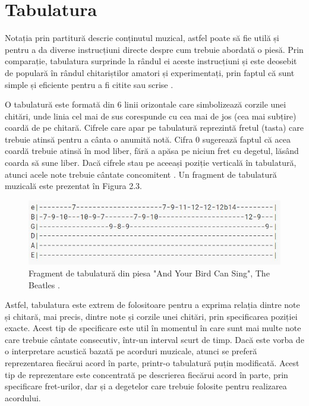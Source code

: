 \documentclass[a4paper,12pt]{report}
\begin{document}
\newpage
\section{Tabulatura}
Notația prin partitură descrie conținutul muzical, astfel poate să fie 
utilă și pentru a da diverse 
instrucțiuni directe despre cum trebuie abordată o piesă.
Prin comparație, tabulatura surprinde la rândul ei 
aceste instrucțiuni și este deosebit de populară în rândul 
chitariștilor amatori și experimentați, prin faptul că sunt simple 
și eficiente pentru a fi citite sau scrise \cite{Generating-Guitar-Tablatures-with-Neural-Networks}.

O tabulatură este formată din 6 linii orizontale care simbolizează 
corzile unei chitări, unde linia cel mai de sus corespunde cu cea mai de 
jos (cea mai subțire) coardă de pe chitară.
Cifrele care apar pe tabulatură reprezintă fretul (tasta) care 
trebuie atinsă pentru a cânta o anumită notă. Cifra 0 sugerează 
faptul că acea coardă trebuie atinsă în mod liber, fără a apăsa 
pe niciun fret cu degetul, lăsând coarda să sune liber. Dacă 
cifrele stau pe aceeași poziție verticală în tabulatură, atunci acele 
note trebuie cântate concomitent \cite{WEBSITE:tabulaturi}. 
Un fragment de tabulatură muzicală este prezentat în Figura 2.3.

\begin{figure}[h!]
    \centering
    \includegraphics[width=12cm]{..//resources//images//tabulatura.JPG}
    \caption{Fragment de tabulatură din piesa 
    "And Your Bird Can Sing", The Beatles \cite{WEBSITE:ultimate-guitar}.}
    \label{}
\end{figure}

Astfel, tabulatura este extrem de folositoare pentru a exprima 
relația dintre note și chitară, mai precis, dintre note și 
corzile unei chitări, prin specificarea poziției exacte.
Acest tip de specificare este util în momentul în care sunt mai multe 
note care trebuie cântate consecutiv, într-un interval scurt de timp. 
Dacă este vorba de o interpretare acustică bazată pe acorduri muzicale, 
atunci se preferă reprezentarea fiecărui acord în parte, printr-o tabulatură
puțin modificată. Acest tip de reprezentare este concentrată pe descrierea 
fiecărui acord în parte, prin specificare fret-urilor, dar și a degetelor 
care trebuie folosite pentru realizarea acordului. 
\end{document}
